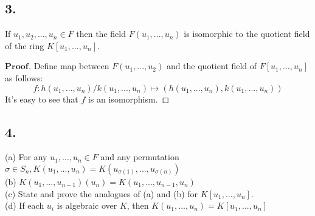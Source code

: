 \documentclass[a4paper, 11pt]{article}
\newenvironment{myprf}
{\renewcommand\qedsymbol{$ $}\begin{proof}[$\textbf{Proof}$]}
  {\end{proof}}
\begin{document}
\subsection*{3.}
\noindent If $u_1,u_2,...,u_n\in F$ then the field $F(u_1,...,u_n)$ is isomorphic to the 
quotient field of the ring $K[u_1,...,u_n]$.
\begin{myprf}
        Define map between $F(u_1,...,u_2)$ and the quotient field of $F[u_1,...,u_n]$
        as follows:
        $$
        f: h(u_1,...,u_n)/k(u_1,...,u_n) \mapsto (h(u_1,...,u_n), k(u_1,...,u_n))
        $$It's easy to see that $f$ is an isomorphism.
\end{myprf}

\subsection*{4.}
\noindent
(a) For any $u_1,...,u_n\in F$ and any permutation $\sigma \in S_n,K(u_1,...,u_n)
    = K(u_{\sigma(1)},...,u_{\sigma(n)})$\\
    (b) $K(u_1,...,u_{n-1})(u_n)=K(u_1,...,u_{n-1}, u_n)$\\
    (c) State and prove the analogues of (a) and (b) for $K[u_1,...,u_n]$.\\
    (d) If each $u_i$ is algebraic over $K$, then $K(u_1,...,u_n)=K[u_1,...,u_n]$\\
\end{document}
